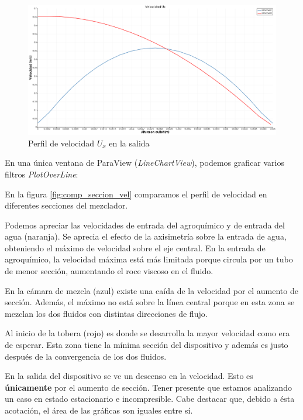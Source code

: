 \documentclass{article}
\begin{document}
\begin{figure}[h!]
	\centering
	\includegraphics[width=1\textwidth]{Figuras/07_comparacion_Ux.png}
	\caption{Perfil de velocidad $U_x$ en la salida}
	\label{fig:curva_comp_ux}
\end{figure}

 En una única ventana de ParaView (\textit{LineChartView}), podemos graficar varios filtros \textit{PlotOverLine}: 
 
 En la figura \ref{fig:comp_seccion_vel} comparamos el perfil de velocidad en diferentes secciones del mezclador. 
 
 Podemos apreciar las velocidades de entrada del agroquímico y de entrada del agua (naranja). Se aprecia el efecto de la axisimetría sobre la entrada de agua, obteniendo el máximo de velocidad sobre el eje central. En la entrada de agroquímico, la velocidad máxima está más limitada porque circula por un tubo de menor sección, aumentando el roce viscoso en el fluido.
 
 En la cámara de mezcla (azul) existe una caída de la velocidad por el aumento de sección. Además, el máximo no está sobre la línea central porque en esta zona se mezclan los dos fluidos con distintas direcciones de flujo.
 
 Al inicio de la tobera (rojo) es donde se desarrolla la mayor velocidad como era de esperar. Esta zona tiene la mínima sección del dispositivo y además es justo después de la convergencia de los dos fluidos.
 
 En la salida del dispositivo se ve un descenso en la velocidad. Esto es \textbf{únicamente} por el aumento de sección. Tener presente que estamos analizando un caso en estado estacionario e incompresible. Cabe destacar que, debido a ésta acotación, el área de las gráficas son iguales entre sí.
\end{document}
